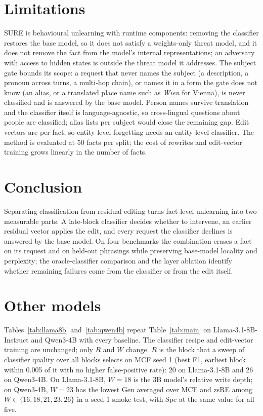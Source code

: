 \documentclass{article}
\theoremstyle{remark}
\theoremstyle{definition}
\begin{document}
\section{Limitations}
\label{sec:limits}
SURE is behavioural unlearning with runtime components: removing the classifier restores the base model, so it does not satisfy a weights-only threat model, and it does not remove the fact from the model's internal representations; an adversary with access to hidden states is outside the threat model it addresses. The subject gate bounds its scope: a request that never names the subject (a description, a pronoun across turns, a multi-hop chain), or names it in a form the gate does not know (an alias, or a translated place name such as \emph{Wien} for Vienna), is never classified and is answered by the base model. Person names survive translation and the classifier itself is language-agnostic, so cross-lingual questions about people are classified; alias lists per subject would close the remaining gap. Edit vectors are per fact, so entity-level forgetting needs an entity-level classifier. The method is evaluated at 50 facts per split; the cost of rewrites and edit-vector training grows linearly in the number of facts.

\section{Conclusion}
Separating classification from residual editing turns fact-level unlearning into two measurable parts. A late-block classifier decides whether to intervene, an earlier residual vector applies the edit, and every request the classifier declines is answered by the base model. On four benchmarks the combination erases a fact on its request and on held-out phrasings while preserving base-model locality and perplexity; the oracle-classifier comparison and the layer ablation identify whether remaining failures come from the classifier or from the edit itself.




\appendix
\onecolumn
\section{Other models}
\label{app:models}
Tables~\ref{tab:llama8b} and~\ref{tab:qwen4b} repeat Table~\ref{tab:main} on Llama-3.1-8B-Instruct and Qwen3-4B with every baseline. The classifier recipe and edit-vector training are unchanged; only $R$ and $W$ change. $R$ is the block that a sweep of classifier quality over all blocks selects on MCF seed 1 (best F1, earliest block within 0.005 of it with no higher false-positive rate): 20 on Llama-3.1-8B and 26 on Qwen3-4B. On Llama-3.1-8B, $W=18$ is the 3B model's relative write depth; on Qwen3-4B, $W=23$ has the lowest Gen averaged over MCF and zsRE among $W\in\{16,18,21,23,26\}$ in a seed-1 smoke test, with Spe at the same value for all five.
\end{document}
